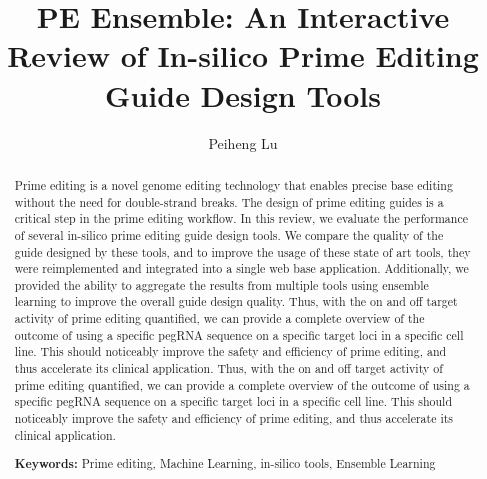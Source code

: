 \documentclass[12pt]{article}
\title{PE Ensemble: An Interactive Review of In-silico Prime Editing Guide Design Tools}
\author{Peiheng Lu}
\begin{document}
\date{}
\maketitle

\begin{abstract}
    Prime editing is a novel genome editing technology that enables precise base editing without the need for double-strand breaks. The design of prime editing guides is a critical step in the prime editing workflow. In this review, we evaluate the performance of several in-silico prime editing guide design tools. We compare the quality of the guide designed by these tools, and to improve the usage of these state of art tools, they were reimplemented and integrated into a single web base application. Additionally, we provided the ability to aggregate the results from multiple tools using ensemble learning to improve the overall guide design quality.
    Thus, with the on and off target activity of prime editing quantified, we can provide a complete overview of the outcome of using a specific pegRNA sequence on a specific target loci in a specific cell line. This should noticeably improve the safety and efficiency of prime editing, and thus accelerate its clinical application.
    Thus, with the on and off target activity of prime editing quantified, we can provide a complete overview of the outcome of using a specific pegRNA sequence on a specific target loci in a specific cell line. This should noticeably improve the safety and efficiency of prime editing, and thus accelerate its clinical application.

    \textbf{Keywords:} Prime editing, Machine Learning, in-silico tools, Ensemble Learning
\end{abstract}

\newpage






\newpage
\appendix



\newpage
\printbibliography
\end{document}
